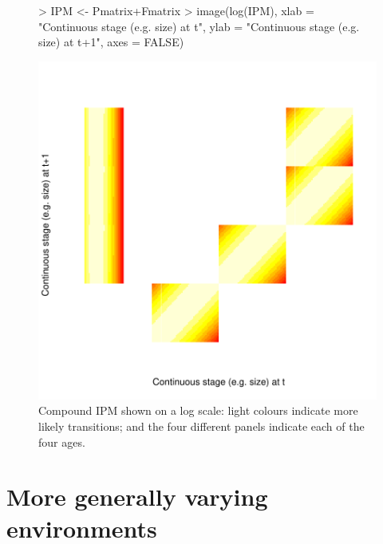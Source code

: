 \documentclass{article}
\begin{document}
\begin{figure}
\begin{center}
\begin{Schunk}
\begin{Sinput}
> IPM <- Pmatrix+Fmatrix
> image(log(IPM),
  	xlab = "Continuous stage (e.g. size) at t",
  		ylab = "Continuous stage (e.g. size) at t+1", axes = FALSE)
\end{Sinput}
\end{Schunk}
\includegraphics{IPMpack_Vignette-figCompound}
\end{center}
\caption{Compound IPM shown on a log scale: light colours indicate
  more likely transitions; and the four different panels indicate each
  of the four ages.}
\label{fig:compound}
\end{figure}




\section{More generally varying environments}
\end{document}
